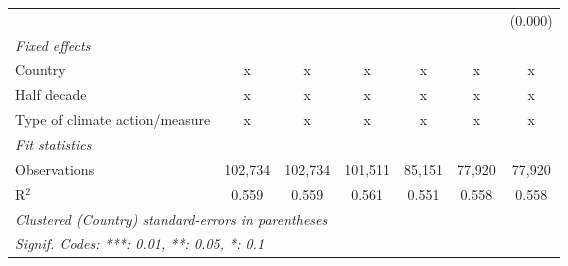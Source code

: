 \begin{tabular}{lcccccc}
                                                   &             &               &              &              &              & (0.000)\\   
   \emph{Fixed effects}\\
   Country                                         & x           & x             & x            & x            & x            & x\\  
   Half decade                                     & x           & x             & x            & x            & x            & x\\  
   Type of climate action/measure                  & x           & x             & x            & x            & x            & x\\  
   \midrule \emph{Fit statistics}\\
   Observations                                    & 102,734     & 102,734       & 101,511      & 85,151       & 77,920       & 77,920\\  
   R$^2$                                           & 0.559       & 0.559         & 0.561        & 0.551        & 0.558        & 0.558\\  
   \midrule
   \multicolumn{7}{l}{\emph{Clustered (Country) standard-errors in parentheses}}\\
   \multicolumn{7}{l}{\emph{Signif. Codes: ***: 0.01, **: 0.05, *: 0.1}}\\
\end{tabular}
\par\endgroup


